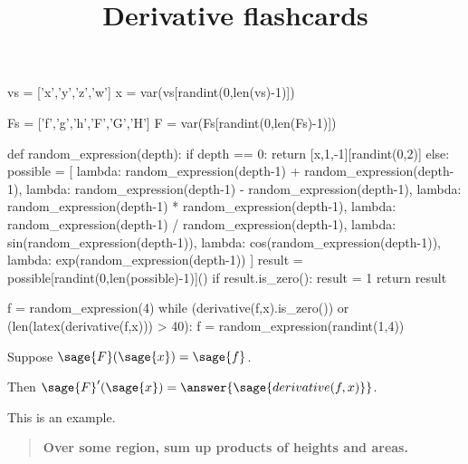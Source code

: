 \documentclass{ximera}
\title{Derivative flashcards}
\begin{document}
\begin{sagesilent}
  vs = ['x','y','z','w']
  x = var(vs[randint(0,len(vs)-1)])

  Fs = ['f','g','h','F','G','H']
  F = var(Fs[randint(0,len(Fs)-1)])
  
  def random_expression(depth):
    if depth == 0:
      return [x,1,-1][randint(0,2)]
    else:
      possible = [
        lambda: random_expression(depth-1) + random_expression(depth-1),
        lambda: random_expression(depth-1) - random_expression(depth-1),
        lambda: random_expression(depth-1) * random_expression(depth-1),
        lambda: random_expression(depth-1) / random_expression(depth-1),
        lambda: sin(random_expression(depth-1)),
        lambda: cos(random_expression(depth-1)),
        lambda: exp(random_expression(depth-1))
      ]
      result = possible[randint(0,len(possible)-1)]()
      if result.is_zero():
        result = 1
      return result

  f = random_expression(4)
  while (derivative(f,x).is_zero()) or (len(latex(derivative(f,x))) > 40):
    f = random_expression(randint(1,4))
\end{sagesilent}

\begin{exercise}

  Suppose $\sage{F}(\sage{x}) = \sage{f}$.

  Then $\sage{F}'(\sage{x}) = \answer{\sage{derivative(f,x)}}$.

\end{exercise}

\begin{example}
  This is an example.
\end{example}

\begin{quote}
\textbf{Over \textcolor{red!50!black}{some region},
\textcolor{green!70!black!70!blue}{sum up} products of
\textcolor{purple!50!blue!90!black}{heights} and \textcolor{blue!70!green}{areas}.}
\end{quote}
\end{document}
